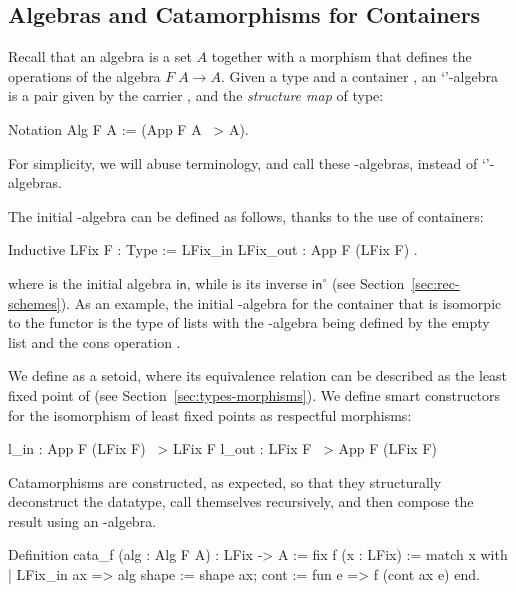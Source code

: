 \documentclass{llncs}
\newcommand{\operator}[1]{\textsf{#1}}
\newcommand{\InOp}{\operator{in}^{\circ}}
\newcommand{\InIso}{\operator{in}}
\begin{document}
\subsection{Algebras and Catamorphisms for Containers}
\label{sec:algebras}

Recall that an algebra is a set $A$ together with a morphism that defines the
operations of the algebra $F\;A \to A$.  Given a type  and a container
, an `'-algebra is a pair given by the carrier , and the
\emph{structure map} of type:
\begin{coqcode}
Notation Alg F A := (App F A ~> A).
\end{coqcode}

\noindent
For simplicity, we will abuse terminology, and call these
-algebras, instead of `'-algebras.

The initial -algebra can be defined as follows, thanks to the use of
containers:
\begin{coqcode}
Inductive LFix F : Type := LFix_in { LFix_out : App F (LFix F) }.
\end{coqcode}

\noindent
where  is the initial algebra $\InIso$, while  is its inverse $\InOp$ (see Section~\ref{sec:rec-schemes}).
As an example, the initial -algebra for the
container that is isomorpic to the functor
 is the type of lists with the -algebra
being defined by the empty list  and the cons
operation .

We define  as a setoid, where its equivalence relation can be
described as the least fixed point of  (see
Section~\ref{sec:types-morphisms}). We define smart constructors for the
isomorphism of least fixed points as respectful morphisms:
\begin{coqcode}
l_in : App F (LFix F) ~> LFix F         l_out : LFix F ~> App F (LFix F)
\end{coqcode}

Catamorphisms are constructed, as expected, so that they structurally
deconstruct the datatype, call themselves recursively, and then compose the
result using an -algebra.
\begin{coqcode}
Definition cata_f (alg : Alg F A) : LFix -> A
  := fix f (x : LFix)
     := match x with
        | LFix_in ax =>
             alg {shape := shape ax; cont := fun e => f (cont ax e)}
        end.
\end{coqcode}
\end{document}
